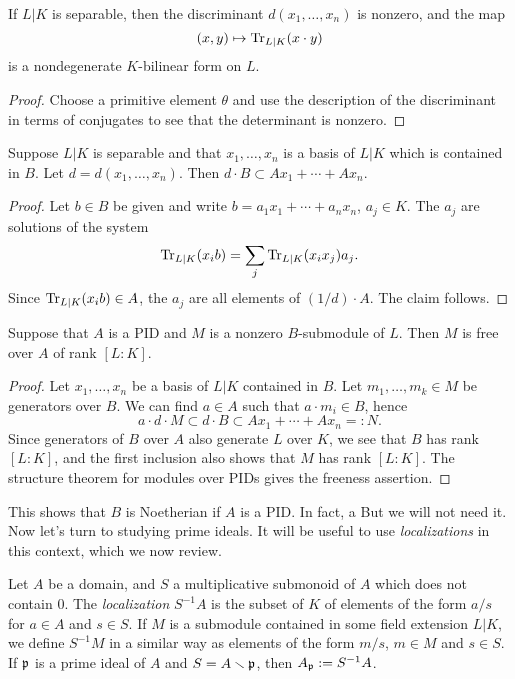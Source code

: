 \begin{lemma}
  If $L|K$ is separable, then the discriminant $d(x_{1},\ldots,x_{n})$ is nonzero, and the map
  \[ (x,y) \mapsto \operatorname{Tr}_{L|K}(x \cdot y) \]
  is a nondegenerate $K$-bilinear form on $L$.
\end{lemma}
\begin{proof}
  Choose a primitive element $\theta$ and use the description of the discriminant in terms of conjugates to see that the determinant is nonzero.
\end{proof}

\begin{lemma}
  Suppose $L|K$ is separable and that $x_{1},\ldots,x_{n}$ is a basis of $L|K$ which is contained in $B$.
  Let $d = d(x_{1},\ldots,x_{n})$.
  Then $d \cdot B \subset A x_{1} + \cdots + A x_{n}$.
\end{lemma}
\begin{proof}
  Let $b \in B$ be given and write $b = a_{1} x_{1} + \cdots + a_{n} x_{n}$, $a_{j} \in K$.
  The $a_{j}$ are solutions of the system
  \[ \operatorname{Tr}_{L|K}(x_{i} b) = \sum_{j} \operatorname{Tr}_{L|K}(x_{i}x_{j}) a_{j}. \]
  Since $\operatorname{Tr}_{L|K}(x_{i} b) \in A$, the $a_{j}$ are all elements of $(1/d) \cdot A$.
  The claim follows.
\end{proof}

\begin{proposition}
  Suppose that $A$ is a PID and $M$ is a nonzero $B$-submodule of $L$.
  Then $M$ is free over $A$ of rank $[L:K]$.
\end{proposition}
\begin{proof}
  Let $x_{1},\ldots,x_{n}$ be a basis of $L|K$ contained in $B$.
  Let $m_{1},\ldots,m_{k} \in M$ be generators over $B$.
  We can find $a \in A$ such that $a \cdot m_{i} \in B$, hence
  \[ a \cdot d \cdot M \subset d \cdot B \subset A x_{1} + \cdots + A x_{n} =: N. \]
  Since generators of $B$ over $A$ also generate $L$ over $K$, we see that $B$ has rank $[L:K]$, and the first inclusion also shows that $M$ has rank $[L:K]$.
  The structure theorem for modules over PIDs gives the freeness assertion.
\end{proof}

This shows that $B$ is Noetherian if $A$ is a PID.
In fact, a  But we will not need it.
Now let's turn to studying prime ideals.
It will be useful to use \emph{localizations} in this context, which we now review.

Let $A$ be a domain, and $S$ a multiplicative submonoid of $A$ which does not contain $0$.
The \emph{localization} $S^{-1}A$ is the subset of $K$ of elements of the form $a/s$ for $a \in A$ and $s \in S$.
If $M$ is a submodule contained in some field extension $L|K$, we define $S^{-1}M$ in a similar way as elements of the form $m/s$, $m \in M$ and $s \in S$.
If $\mathfrak{p}$ is a prime ideal of $A$ and $S = A \smallsetminus \mathfrak{p}$, then $A_{\mathfrak{p}} := S^{-1}A$.

